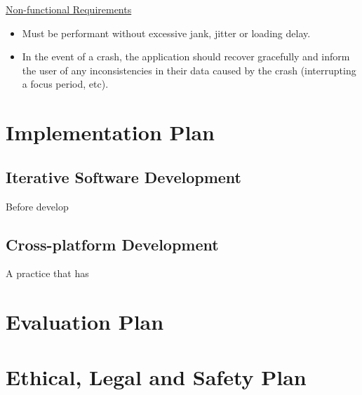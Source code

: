 \underline{Non-functional Requirements}
\begin{itemize}
    \item Must be performant without excessive jank, jitter or loading delay.
    \item In the event of a crash, the application should recover gracefully and inform the user of any inconsistencies in their data caused by the crash (interrupting a focus period, etc).
\end{itemize}


\section{Implementation Plan}

\subsection{Iterative Software Development}
Before develop


\subsection{Cross-platform Development}
A practice that has


\section{Evaluation Plan}


\section{Ethical, Legal and Safety Plan}